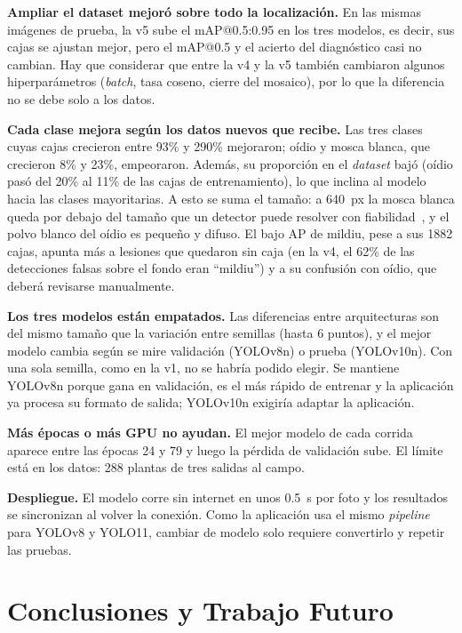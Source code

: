 \documentclass[sensors,article,submit,pdftex,moreauthors]{Definitions/mdpi}
\begin{document}
\textbf{Ampliar el dataset mejoró sobre todo la localización.} En las mismas imágenes de prueba, la v5 sube el mAP@0.5:0.95 en los tres modelos, es decir, sus cajas se ajustan mejor, pero el mAP@0.5 y el acierto del diagnóstico casi no cambian. Hay que considerar que entre la v4 y la v5 también cambiaron algunos hiperparámetros (\emph{batch}, tasa coseno, cierre del mosaico), por lo que la diferencia no se debe solo a los datos.

\textbf{Cada clase mejora según los datos nuevos que recibe.} Las tres clases cuyas cajas crecieron entre 93\% y 290\% mejoraron; oídio y mosca blanca, que crecieron 8\% y 23\%, empeoraron. Además, su proporción en el \emph{dataset} bajó (oídio pasó del 20\% al 11\% de las cajas de entrenamiento), lo que inclina al modelo hacia las clases mayoritarias. A esto se suma el tamaño: a 640~px la mosca blanca queda por debajo del tamaño que un detector puede resolver con fiabilidad~\cite{Zhang2024Jute}, y el polvo blanco del oídio es pequeño y difuso. El bajo AP de mildiu, pese a sus 1882 cajas, apunta más a lesiones que quedaron sin caja (en la v4, el 62\% de las detecciones falsas sobre el fondo eran ``mildiu'') y a su confusión con oídio, que deberá revisarse manualmente.

\textbf{Los tres modelos están empatados.} Las diferencias entre arquitecturas son del mismo tamaño que la variación entre semillas (hasta 6 puntos), y el mejor modelo cambia según se mire validación (YOLOv8n) o prueba (YOLOv10n). Con una sola semilla, como en la v1, no se habría podido elegir. Se mantiene YOLOv8n porque gana en validación, es el más rápido de entrenar y la aplicación ya procesa su formato de salida; YOLOv10n exigiría adaptar la aplicación.

\textbf{Más épocas o más GPU no ayudan.} El mejor modelo de cada corrida aparece entre las épocas 24 y 79 y luego la pérdida de validación sube. El límite está en los datos: 288 plantas de tres salidas al campo.

\textbf{Despliegue.} El modelo corre sin internet en unos 0.5~s por foto y los resultados se sincronizan al volver la conexión. Como la aplicación usa el mismo \emph{pipeline} para YOLOv8 y YOLO11, cambiar de modelo solo requiere convertirlo y repetir las pruebas.

\section{Conclusiones y Trabajo Futuro}
\end{document}
